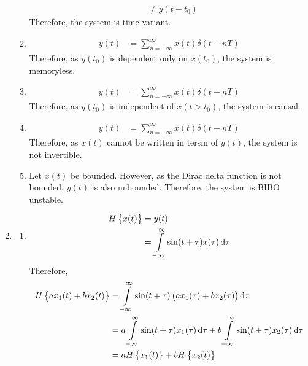 \documentclass[fleqn, a4paper, 11pt, oneside]{amsart}
\theoremstyle{definition}
\theoremstyle{theorem}
\begin{document}
\begin{solution}
\begin{enumerate}[leftmargin=*]
\begin{enumerate}
\begin{align*}
                                                                             & \neq y(t - t_0)
					\end{align*}
					Therefore, the system is time-variant.
				\item
					\begin{align*}
						y(t) & = \sum\limits_{n = -\infty}^{\infty} x(t) \delta(t - n T)
					\end{align*}
					Therefore, as $y(t_0)$ is dependent only on $x(t_0)$, the system is memoryless.
				\item
					\begin{align*}
						y(t) & = \sum\limits_{n = -\infty}^{\infty} x(t) \delta(t - n T)
					\end{align*}
					Therefore, as $y(t_0)$ is independent of $x(t > t_0)$, the system is causal.
				\item
					\begin{align*}
						y(t) & = \sum\limits_{n = -\infty}^{\infty} x(t) \delta(t - n T)
					\end{align*}
					Therefore, as $x(t)$ cannot be written in tersm of $y(t)$, the system is not invertible.
				\item
					Let $x(t)$ be bounded.
					However, as the Dirac delta function is not bounded, $y(t)$ is also unbounded.
					Therefore, the system is BIBO unstable.
			\end{enumerate}
		\item
			\begin{enumerate}
				\item
					\begin{align*}
						H\left\{ x(t) \right\} & = y(t) \\
                                                                       & = \int\limits_{-\infty}^{\infty} \sin(t + \tau) x(\tau) \dif \tau
					\end{align*}
					Therefore,
					\begin{align*}
						H\left\{ a x_1(t) + b x_2(t) \right\} & = \int\limits_{-\infty}^{\infty} \sin(t + \tau) \left( a x_1(\tau) + b x_2(\tau) \right) \dif \tau                                          \\
                                                                                      & = a \int\limits_{-\infty}^{\infty} \sin(t + \tau) x_1(\tau) \dif \tau + b \int\limits_{-\infty}^{\infty} \sin(t + \tau) x_2(\tau) \dif \tau \\
                                                                                      & = a H\left\{ x_1(t) \right\} + b H\left\{ x_2(t) \right\}

\end{align*}
\end{enumerate}
\end{enumerate}
\end{solution}
\end{document}

